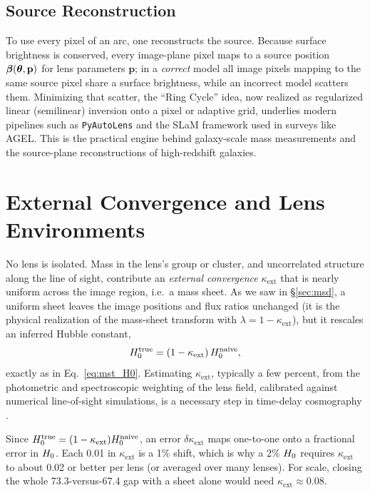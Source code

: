 \subsection{Source Reconstruction}
\label{sec:source_reconstruction}

To use every pixel of an arc, one reconstructs the source.  Because
surface brightness is conserved, every image-plane pixel maps to a source
position $\boldsymbol{\beta}(\boldsymbol{\theta},\mathbf{p})$ for lens parameters
$\mathbf{p}$; in a \emph{correct} model all image pixels mapping to the
same source pixel share a surface brightness, while an incorrect model
scatters them.  Minimizing that scatter, the ``Ring Cycle'' idea,
now realized as regularized linear (semilinear) inversion onto a pixel
or adaptive grid, underlies modern pipelines such as
\texttt{PyAutoLens} and the SLaM framework used in surveys like AGEL.
This is the practical engine behind galaxy-scale mass measurements and
the source-plane reconstructions of high-redshift galaxies.


\section{External Convergence and Lens Environments}
\label{sec:external_convergence}

No lens is isolated.  Mass in the lens's group or cluster, and
uncorrelated structure along the line of sight, contribute an
\emph{external convergence} $\kappa_{\mathrm{ext}}$ that is nearly
uniform across the image region, i.e.\ a mass sheet.  As we saw in
\S\ref{sec:msd}, a uniform sheet leaves the image positions and flux
ratios unchanged (it is the physical realization of the mass-sheet
transform with $\lambda = 1 - \kappa_{\mathrm{ext}}$), but it rescales an
inferred Hubble constant,
\begin{equation}
    H_0^{\mathrm{true}}
    = (1 - \kappa_{\mathrm{ext}})\,H_0^{\mathrm{naive}},
    \label{eq:kappa_ext_H0}
\end{equation}
exactly as in Eq.~\eqref{eq:mst_H0}.  Estimating
$\kappa_{\mathrm{ext}}$, typically a few percent, from the
photometric and spectroscopic weighting of the lens field, calibrated
against numerical line-of-sight simulations, is a necessary
step in time-delay cosmography
\citep{wong_h0licow_2020,Birrer2020}.

\begin{annotation}
Since $H_0^{\mathrm{true}} = (1-\kappa_{\mathrm{ext}})H_0^{\mathrm{naive}}$,
an error $\delta\kappa_{\mathrm{ext}}$ maps one-to-one onto a fractional error
in $H_0$.  Each 0.01 in $\kappa_{\mathrm{ext}}$ is a 1\% shift, which is
why a 2\% $H_0$ requires $\kappa_{\mathrm{ext}}$ to about 0.02 or better
per lens (or averaged over many lenses).  For scale, closing the whole
73.3-versus-67.4 gap with a sheet alone would need
$\kappa_{\mathrm{ext}} \approx 0.08$.
\end{annotation}


